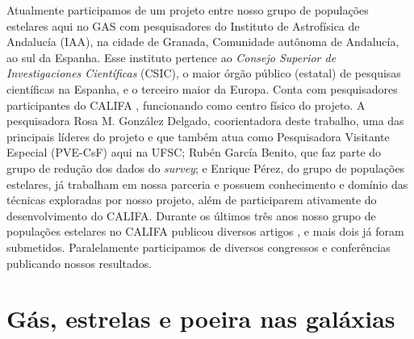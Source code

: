 Atualmente participamos de um projeto entre nosso grupo de populações estelares aqui no GAS com
pesquisadores do Instituto de Astrofísica de Andalucía (IAA), na cidade de Granada, Comunidade
autônoma de Andalucía, ao sul da Espanha. Esse instituto pertence ao {\em Consejo Superior de
Investigaciones Científicas} (CSIC), o maior órgão público (estatal) de pesquisas científicas na
Espanha, e o terceiro maior da Europa. Conta com pesquisadores participantes do CALIFA
\citep[][]{Sanchez.etal.2012a}, funcionando como centro físico do projeto. A pesquisadora Rosa M.
González Delgado, coorientadora deste trabalho, uma das principais líderes do projeto e que também
atua como Pesquisadora Visitante Especial (PVE-CsF) aqui na UFSC; Rubén García Benito, que faz parte
do grupo de redução dos dados do {\em survey}; e Enrique Pérez, do grupo de populações estelares, já
trabalham em nossa parceria e possuem conhecimento e domínio das técnicas exploradas por nosso
projeto, além de participarem ativamente do desenvolvimento do CALIFA. Durante os últimos três anos
nosso grupo de populações estelares no CALIFA publicou diversos artigos \citep[e.g.,
][]{Perez.etal.2013a, GonzalezDelgado.etal.2014a, GonzalezDelgado.etal.2014b,
GonzalezDelgado.etal.2015a}, e mais dois já foram submetidos. Paralelamente participamos de diversos
congressos e conferências publicando nossos resultados.


\section{Gás, estrelas e poeira nas galáxias}
\label{sec:intro:galaxias}

